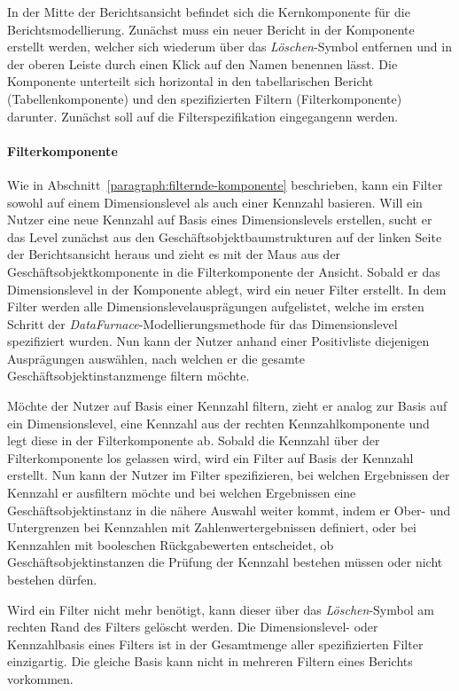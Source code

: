 \documentclass[
  language=german, %
  type=bachelor%
]{isthesis}
\begin{document}
\begin{content}
  In der Mitte der Berichtsansicht befindet sich die Kernkomponente für die
  Berichtsmodellierung. Zunächst muss ein neuer Bericht
  in der Komponente erstellt werden, welcher sich wiederum über das
  \textit{Löschen}-Symbol entfernen und in der oberen Leiste durch einen Klick
  auf den Namen benennen lässt. Die Komponente unterteilt sich horizontal in
  den tabellarischen Bericht (Tabellenkomponente) und den spezifizierten
  Filtern (Filterkomponente) darunter. Zunächst soll auf die
  Filterspezifikation eingegangenn werden. 
  
  \paragraph{Filterkomponente}
  
  Wie in Abschnitt~\ref{paragraph:filternde-komponente}
  beschrieben, kann ein Filter sowohl auf einem Dimensionslevel als auch einer
  Kennzahl basieren. Will ein Nutzer eine neue Kennzahl auf Basis eines
  Dimensionslevels erstellen, sucht er das Level zunächst aus den
  Geschäftsobjektbaumstrukturen auf der linken Seite der Berichtsansicht heraus
  und zieht es mit der Maus aus der Geschäftsobjektkomponente in die
  Filterkomponente der Ansicht. Sobald er das Dimensionslevel in der Komponente
  ablegt, wird ein neuer Filter erstellt. In dem Filter werden alle
  Dimensionslevelausprägungen aufgelistet, welche im ersten Schritt der
  \textit{DataFurnace}-Modellierungsmethode für das Dimensionslevel
  spezifiziert wurden. Nun kann der Nutzer anhand einer Positivliste
  diejenigen Ausprägungen auswählen, nach welchen er die gesamte
  Geschäftsobjektinstanzmenge filtern möchte.

  Möchte der Nutzer auf Basis einer Kennzahl filtern, zieht er analog zur
  Basis auf ein Dimensionslevel, eine Kennzahl aus der rechten
  Kennzahlkomponente und legt diese in der Filterkomponente ab. Sobald die
  Kennzahl über der Filterkomponente los gelassen wird, wird ein Filter auf
  Basis der Kennzahl erstellt. Nun kann der Nutzer im Filter spezifizieren, bei
  welchen Ergebnissen der Kennzahl er ausfiltern möchte und bei welchen
  Ergebnissen eine Geschäftsobjektinstanz in die nähere Auswahl weiter kommt,
  indem er \zB{} Ober- und Untergrenzen bei Kennzahlen mit
  Zahlenwertergebnissen definiert, oder bei Kennzahlen mit booleschen
  Rückgabewerten entscheidet, ob Geschäftsobjektinstanzen die Prüfung der
  Kennzahl bestehen müssen oder nicht bestehen dürfen.

  Wird ein Filter nicht mehr benötigt, kann dieser über das
  \textit{Löschen}-Symbol am rechten Rand des Filters gelöscht werden. Die
  Dimensionslevel- oder Kennzahlbasis eines Filters ist in der Gesamtmenge
  aller spezifizierten Filter einzigartig. Die gleiche Basis kann nicht in
  mehreren Filtern eines Berichts vorkommen.


\end{content}
\end{document}
